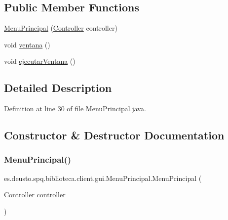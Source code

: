 \subsection*{Public Member Functions}
\begin{DoxyCompactItemize}
\item 
\mbox{\hyperlink{classes_1_1deusto_1_1spq_1_1biblioteca_1_1client_1_1gui_1_1_menu_principal_a5f5ca87246a3a113fcf053266649efd0}{Menu\+Principal}} (\mbox{\hyperlink{classes_1_1deusto_1_1spq_1_1biblioteca_1_1controller_1_1_controller}{Controller}} controller)
\item 
void \mbox{\hyperlink{classes_1_1deusto_1_1spq_1_1biblioteca_1_1client_1_1gui_1_1_menu_principal_a6d0a1420be215523ce7195628b2c3002}{ventana}} ()
\item 
void \mbox{\hyperlink{classes_1_1deusto_1_1spq_1_1biblioteca_1_1client_1_1gui_1_1_menu_principal_a8f37cacc1f9ccc9b65f768d1cb5bc9c8}{ejecutar\+Ventana}} ()
\end{DoxyCompactItemize}


\subsection{Detailed Description}


Definition at line 30 of file Menu\+Principal.\+java.



\subsection{Constructor \& Destructor Documentation}
\mbox{\label{classes_1_1deusto_1_1spq_1_1biblioteca_1_1client_1_1gui_1_1_menu_principal_a5f5ca87246a3a113fcf053266649efd0}} 
\subsubsection{\texorpdfstring{Menu\+Principal()}{MenuPrincipal()}}
{\footnotesize\ttfamily es.\+deusto.\+spq.\+biblioteca.\+client.\+gui.\+Menu\+Principal.\+Menu\+Principal (\begin{DoxyParamCaption}\item[{\mbox{\hyperlink{classes_1_1deusto_1_1spq_1_1biblioteca_1_1controller_1_1_controller}{Controller}}}]{controller }\end{DoxyParamCaption})}

